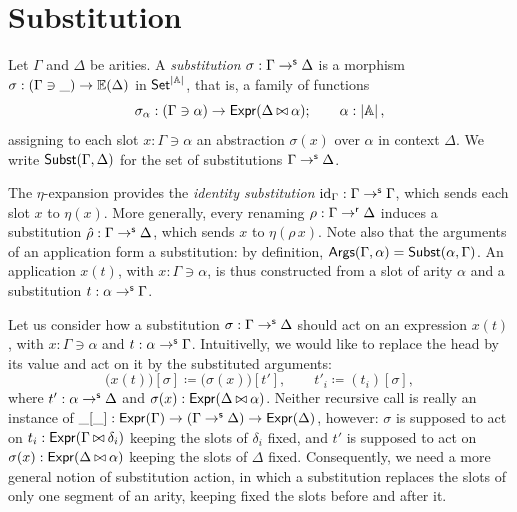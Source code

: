 \section{Substitution}

\begin{definition}
    Let $\Gamma$ and $\Delta$ be arities. A \emph{substitution} $\sigma : \Gamma \to^{\mathsf{s}} \Delta$ is a morphism $\sigma : (\Gamma \ni \_) \to \mathbb{E}(\Delta)$ in $\mathsf{Set}^{\left|\mathbb{A}\right|}$, that is, a family of functions
    \[
    \sigma_\alpha : (\Gamma \ni \alpha) \to \mathsf{Expr}(\Delta \mathbin{\bowtie} \alpha); \qquad \alpha : \left|\mathbb{A}\right|,
    \]
    assigning to each slot $x : \Gamma \ni \alpha$ an abstraction $\sigma(x)$ over $\alpha$ in context $\Delta$. We write $\mathsf{Subst}(\Gamma, \Delta)$ for the set of substitutions $\Gamma \to^{\mathsf{s}} \Delta$.
\end{definition}

The $\eta$-expansion provides the \emph{identity substitution} $\mathrm{id}_\Gamma : \Gamma \to^{\mathsf{s}} \Gamma$, which sends each slot $x$ to $\eta(x)$. More generally, every renaming $\rho : \Gamma \to^{\mathsf{r}} \Delta$ induces a substitution $\hat{\rho} : \Gamma \to^{\mathsf{s}} \Delta$, which sends $x$ to $\eta(\rho\, x)$. Note also that the arguments of an application form a substitution: by definition, $\mathsf{Args}(\Gamma, \alpha) = \mathsf{Subst}(\alpha, \Gamma)$. An application $x(t)$, with $x : \Gamma \ni \alpha$, is thus constructed from a slot of arity $\alpha$ and a substitution $t : \alpha \to^{\mathsf{s}} \Gamma$.

Let us consider how a substitution $\sigma : \Gamma \to^{\mathsf{s}} \Delta$ should act on an expression $x(t)$, with $x : \Gamma \ni \alpha$ and $t : \alpha \to^{\mathsf{s}} \Gamma$. Intuitivelly, we would like to replace the head by its value and act on it by the substituted arguments:
\[
\big(x(t)\big)[\sigma] \coloneqq \big(\sigma(x)\big)[t'], \qquad t'_i \coloneqq (t_i)[\sigma],
\]
where $t' : \alpha \to^{\mathsf{s}} \Delta$ and $\sigma(x) : \mathsf{Expr}(\Delta \mathbin{\bowtie} \alpha)$. Neither recursive call is really an instance of $\_[\_] : \mathsf{Expr}(\Gamma) \to (\Gamma \to^{\mathsf{s}} \Delta) \to \mathsf{Expr}(\Delta)$, however: $\sigma$ is supposed to act on $t_i : \mathsf{Expr}(\Gamma \mathbin{\bowtie} \delta_i)$ keeping the slots of $\delta_i$ fixed, and $t'$ is supposed to act on $\sigma(x) : \mathsf{Expr}(\Delta \mathbin{\bowtie} \alpha)$ keeping the slots of $\Delta$ fixed. Consequently, we need a more general notion of substitution action, in which a substitution replaces the slots of only one segment of an arity, keeping fixed the slots before and after it.

